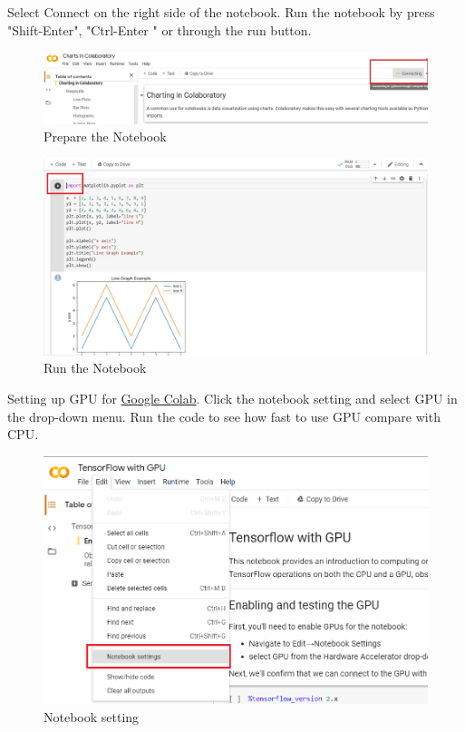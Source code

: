 \documentclass[a4paper,10pt]{article}
\begin{document}
\vspace{2mm}

Select Connect on the right side of the notebook. Run the notebook by press "Shift-Enter", "Ctrl-Enter " or through the run button.    

\vspace{2mm}

\begin{figure}[H]
\centering
\includegraphics[width=1\columnwidth]{Pictures/Colab_Connect.jpg}
\caption[Short title]{Prepare the Notebook}
\label{fig:ff1}\end{figure}


\begin{figure}[H]
\centering
\includegraphics[width=1\columnwidth]{Pictures/Colab_Run.jpg}
\caption[Short title]{Run the Notebook}
\label{fig:ff1}\end{figure}



Setting up GPU for \href{https://colab.research.google.com/notebooks/gpu.ipynb#scrollTo=bwdaz5SIOGe9}{Google Colab}. Click the notebook setting and select GPU in the drop-down menu. Run the code to see how fast to use GPU compare with CPU. 

\begin{figure}[H]
\centering
\includegraphics[width=1\columnwidth]{Pictures/Colab_set.png}
\caption[Short title]{Notebook setting}
\label{fig:ff1}\end{figure}
\end{document}

